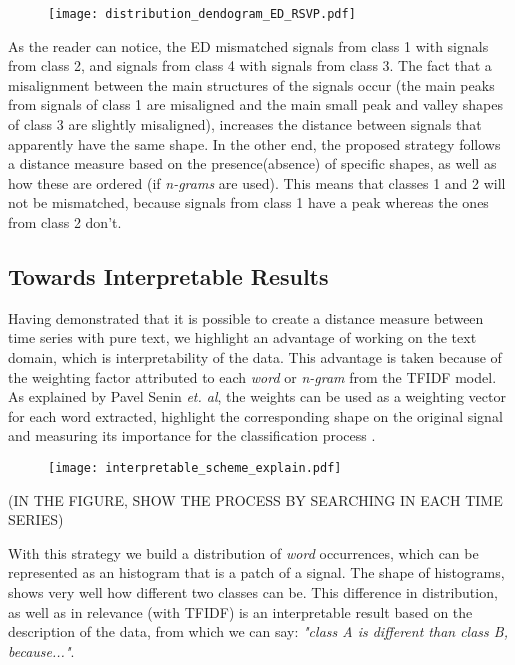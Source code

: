 {\begin{figure}
    \centering
    \texttt{[image: distribution\_dendogram\_ED\_RSVP.pdf]}
    \caption{}
    \label{fig:distribution_dendogram}
\end{figure}
 
As the reader can notice, the \gls{ED} mismatched signals from class 1 with signals from class 2, and signals from class 4 with signals from class 3. The fact that a misalignment between the main structures of the signals occur (the main peaks from signals of class 1 are misaligned and the main small peak and valley shapes of class 3 are slightly misaligned), increases the distance between signals that apparently have the same shape. In the other end, the proposed strategy follows a distance measure based on the presence(absence) of specific shapes, as well as how these are ordered (if \textit{n-grams} are used). This means that classes 1 and 2 will not be mismatched, because signals from class 1 have a peak whereas the ones from class 2 don't.

\subsection{Towards Interpretable Results}

Having demonstrated that it is possible to create a distance measure between time series with pure text, we highlight an advantage of working on the text domain, which is interpretability of the data. This advantage is taken because of the weighting factor attributed to each \textit{word} or \textit{n-gram} from the \gls{TFIDF} model. As explained by Pavel Senin \textit{et. al}, the weights can be used as a weighting vector for each word extracted, highlight the corresponding shape on the original signal and measuring its importance for the classification process \cite{sax_vsm}.

\begin{figure}
    \centering
    \texttt{[image: interpretable\_scheme\_explain.pdf]}
    \caption{}
    \label{fig:distribution_dendogram}
\end{figure}

(IN THE FIGURE, SHOW THE PROCESS BY SEARCHING IN EACH TIME SERIES)

With this strategy we build a distribution of \textit{word} occurrences, which can be represented as an histogram that is a patch of a signal. The shape of histograms, shows very well how different two classes can be. This difference in distribution, as well as in relevance (with \gls{TFIDF}) is an interpretable result based on the description of the data, from which we can say: \textit{"class A is different than class B, because..."}.


}
